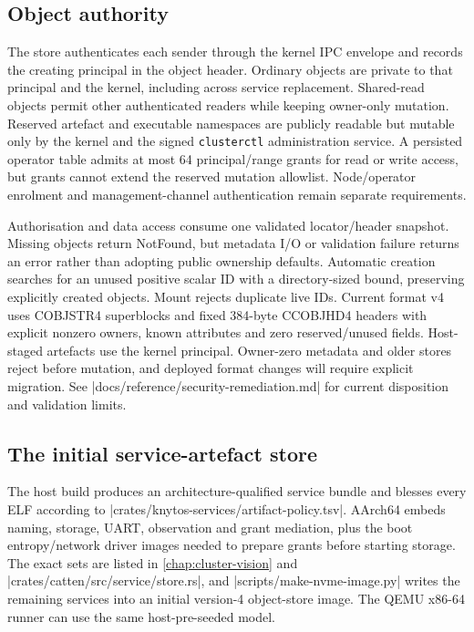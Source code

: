 \subsection{Object authority}

The store authenticates each sender through the kernel IPC envelope and records
the creating principal in the object header. Ordinary objects are private to
that principal and the kernel, including across service replacement. Shared-read
objects permit other authenticated readers while keeping owner-only mutation.
Reserved artefact and executable namespaces are publicly readable but mutable
only by the kernel and the signed \texttt{clusterctl} administration service.
A persisted operator table admits at most 64 principal/range grants for read or
write access, but grants cannot extend the reserved mutation allowlist. Node/operator
enrolment and management-channel authentication remain separate requirements.

Authorisation and data access consume one validated locator/header snapshot.
Missing objects return NotFound, but metadata I/O or validation failure returns an
error rather than adopting public ownership defaults. Automatic creation searches
for an unused positive scalar ID with a directory-sized bound, preserving
explicitly created objects. Mount rejects duplicate live IDs. Current format
v4 uses COBJSTR4 superblocks and fixed 384-byte CCOBJHD4 headers with explicit
nonzero owners, known attributes and zero reserved/unused fields. Host-staged
artefacts use the kernel principal. Owner-zero metadata and older stores reject
before mutation, and deployed format changes will require explicit migration.
See \repofile|docs/reference/security-remediation.md| for current disposition
and validation limits.

\subsection{The initial service-artefact store}

The host build produces an architecture-qualified service bundle and blesses
every ELF according to
\repofile|crates/knytos-services/artifact-policy.tsv|. AArch64 embeds naming,
storage, UART, observation and grant mediation, plus the boot entropy/network
driver images needed to prepare grants before starting storage. The exact sets
are listed in \autoref{chap:cluster-vision} and
\repofile|crates/catten/src/service/store.rs|, and
\repofile|scripts/make-nvme-image.py| writes the remaining
services into an initial version-4 object-store image. The QEMU x86-64 runner
can use the same host-pre-seeded model.

